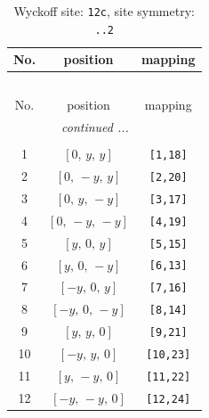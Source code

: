 \documentclass[fleqn,8pt]{jsarticle}
\begin{document}
\begin{longtable}{ccc}
\caption{Wyckoff site: {\tt 12c}, site symmetry: {\tt ..2}}
 \\
 \hline \hline
No. & position & mapping \\ \hline \endfirsthead

\multicolumn{2}{l}{\tablename\ \thetable{}} \\
 \hline \hline
No. & position & mapping \\ \hline \endhead

 \hline \hline
\multicolumn{2}{r}{\footnotesize\it continued ...} \\ \endfoot

 \hline \hline
\multicolumn{2}{r}{} \\ \endlastfoot

1 & $\left[ 0,\, y,\, y \right]$ & {\tt [1,18]} \\ \hline
2 & $\left[ 0,\, - y,\, y \right]$ & {\tt [2,20]} \\ \hline
3 & $\left[ 0,\, y,\, - y \right]$ & {\tt [3,17]} \\ \hline
4 & $\left[ 0,\, - y,\, - y \right]$ & {\tt [4,19]} \\ \hline
5 & $\left[ y,\, 0,\, y \right]$ & {\tt [5,15]} \\ \hline
6 & $\left[ y,\, 0,\, - y \right]$ & {\tt [6,13]} \\ \hline
7 & $\left[ - y,\, 0,\, y \right]$ & {\tt [7,16]} \\ \hline
8 & $\left[ - y,\, 0,\, - y \right]$ & {\tt [8,14]} \\ \hline
9 & $\left[ y,\, y,\, 0 \right]$ & {\tt [9,21]} \\ \hline
10 & $\left[ - y,\, y,\, 0 \right]$ & {\tt [10,23]} \\ \hline
11 & $\left[ y,\, - y,\, 0 \right]$ & {\tt [11,22]} \\ \hline
12 & $\left[ - y,\, - y,\, 0 \right]$ & {\tt [12,24]} \\
\end{longtable}
\renewcommand{\arraystretch}{1.2}
\end{document}
